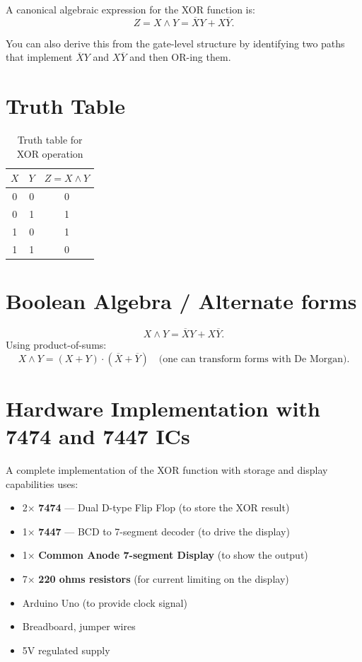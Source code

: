 \documentclass[12pt,a4paper]{article}
\begin{document}
A canonical algebraic expression for the XOR function is:
\[
Z = X \wedge Y = \overline{X}Y + X\overline{Y}.
\]

You can also derive this from the gate-level structure by identifying two paths that implement $\overline{X}Y$ and $X\overline{Y}$ and then OR-ing them.

\section*{Truth Table}
\begin{table}[H]
\centering
\begin{tabular}{@{}c c c@{}}
\toprule
$X$ & $Y$ & $Z = X \wedge Y$ \\
\midrule
0 & 0 & 0 \\
0 & 1 & 1 \\
1 & 0 & 1 \\
1 & 1 & 0 \\
\bottomrule
\end{tabular}
\caption{Truth table for XOR operation}
\end{table}

\section*{Boolean Algebra / Alternate forms}
\[
X \wedge Y = \overline{X}Y + X\overline{Y}.
\]
Using product-of-sums:
\[
X \wedge Y = (X + Y)\cdot(\overline{X} + \overline{Y}) \quad\text{(one can transform forms with De Morgan).}
\]

\section*{Hardware Implementation with 7474 and 7447 ICs}
A complete implementation of the XOR function with storage and display capabilities uses:

\begin{itemize}
  \item 2× \textbf{7474} — Dual D-type Flip Flop (to store the XOR result)
  \item 1× \textbf{7447} — BCD to 7-segment decoder (to drive the display)
  \item 1× \textbf{Common Anode 7-segment Display} (to show the output)
  \item 7× \textbf{220 ohms resistors} (for current limiting on the display)
  \item Arduino Uno (to provide clock signal)
  \item Breadboard, jumper wires
  \item 5V regulated supply
\end{itemize}
\end{document}
